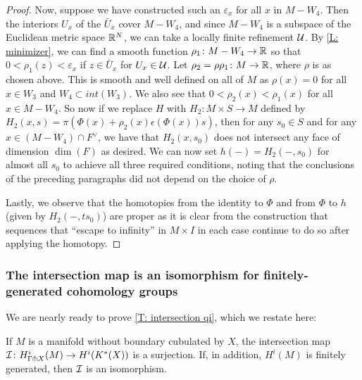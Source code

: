 \begin{proof}
	Now, suppose we have constructed such an $\varepsilon_x$ for all $x$ in $M - W_4$.
	Then the interiors $U_x$ of the $\bar U_x$ cover $M - W_4$, and since $M - W_4$ is a subspace of the Euclidean metric space $\mathbb{R}^N$, we can take a locally finite refinement $\mathcal{U}$.
	By \cref{L: minimizer}, we can find a smooth function $\rho_1 \colon M - W_4 \to \mathbb{R}$ so that $0<\rho_1(z)<\varepsilon_x$ if $z \in \bar U_x$ for $U_x \in \mathcal{U}$.
	Let $\rho_2 = \rho\rho_1 \colon M \to \mathbb{R}$, where $\rho$ is as chosen above.
	This is smooth and well defined on all of $M$ as $\rho(x) = 0$ for all $x \in W_3$ and $W_4 \subset int(W_3)$.
	We also see that $0<\rho_2(x)<\rho_1(x)$ for all $x \in M - W_4$.
	So now if we replace $H$ with $H_2 \colon M \times S \to M$ defined by $H_2(x,s) = \pi(\Phi(x)+\rho_2(x)\epsilon(\Phi(x)) s)$, then for any $s_0 \in S$ and for any $x \in (M - W_4) \cap F^\vee$, we have that $H_2(x,s_0)$ does not intersect any face of dimension $\dim(F)$ as desired.
	We can now set $h(-) = H_2(-,s_0)$ for almost all $s_0$ to achieve all three required conditions, noting that the conclusions of the preceding paragraphs did not depend on the choice of $\rho$.


	Lastly, we observe that the homotopies from the identity to $\Phi$ and from $\Phi$ to $h$ (given by $H_2(-,ts_0)$) are proper as it is clear from the construction that sequences that ``escape to infinity'' in $M \times I$ in each case continue to do so after applying the homotopy.
\end{proof}

\subsubsection{The intersection map is an isomorphism for finitely-generated cohomology groups}

We are nearly ready to prove \cref{T: intersection qi}, which we restate here:



\begin{theorem*}
	If $M$ is a manifold without boundary cubulated by $X$, the intersection map $\mathcal{I} \colon H^i_{\Gamma \pitchfork X}(M) \to H^i(K^*(X))$ is a surjection.
	If, in addition, $H^i(M)$ is finitely generated, then $\mathcal{I}$ is an isomorphism.
\end{theorem*}

